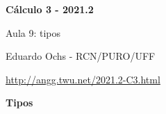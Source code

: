 \documentclass[oneside,12pt]{article}
\begin{document}



\def\drafturl{http://angg.twu.net/LATEX/2021-2-C3.pdf}
\def\drafturl{http://angg.twu.net/2021.2-C3.html}
\def\draftfooter{\tiny \href{\drafturl}{\jobname{}} \ColorBrown{\shorttoday{} \hours}}

\def\rq{\ColorRed{?}}
\def\undq#1{\underbrace{#1}_{\rq}}




%

\thispagestyle{empty}

\begin{center}

\vspace*{1.2cm}

{\bf \Large Cálculo 3 - 2021.2}

\bsk

Aula 9: tipos

\bsk

Eduardo Ochs - RCN/PURO/UFF

\url{http://angg.twu.net/2021.2-C3.html}

\end{center}

\newpage


{\bf Tipos}

\ssk
\end{document}
